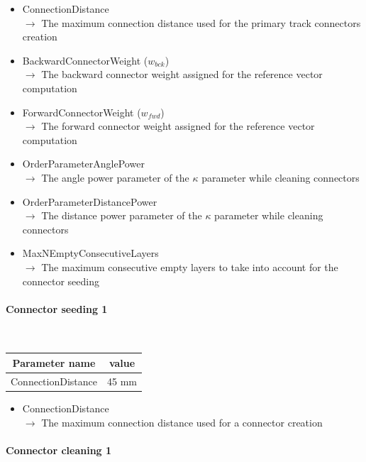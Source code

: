 \documentclass[cits]{JINST}
\begin{document}
\begin{itemize}
  \item ConnectionDistance \\
  $\rightarrow$ The maximum connection distance used for the primary track connectors creation
  \item BackwardConnectorWeight ($w_{bck}$) \\
  $\rightarrow$ The backward connector weight assigned for the reference vector computation
  \item ForwardConnectorWeight ($w_{fwd}$) \\
  $\rightarrow$ The forward connector weight assigned for the reference vector computation
  \item OrderParameterAnglePower \\ 
  $\rightarrow$ The angle power parameter of the $\kappa$ parameter while cleaning connectors
  \item OrderParameterDistancePower \\
  $\rightarrow$ The distance power parameter of the $\kappa$ parameter while cleaning connectors
  \item MaxNEmptyConsecutiveLayers \\
  $\rightarrow$ The maximum consecutive empty layers to take into account for the connector seeding
\end{itemize}


\paragraph{Connector seeding 1} ~

\begin{table}[!ht]
  \begin{center}
    \begin{tabu} to \linewidth { c | c } 
          Parameter name & value \\
          \hline
          ConnectionDistance & 45 mm
    \end{tabu} 
  \end{center}
\end{table}

\begin{itemize}
  \item ConnectionDistance \\
  $\rightarrow$ The maximum connection distance used for a connector creation
\end{itemize}


\newpage
\paragraph{Connector cleaning 1} ~
\end{document}
